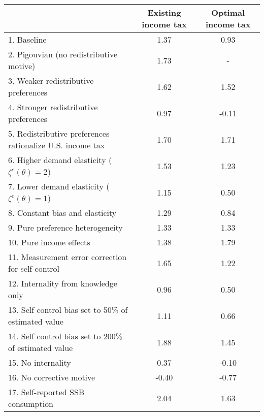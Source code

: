 \begin{tabular}{lcc}
\hline
\hline
 & Existing income tax & Optimal income tax \\
\hline
1. Baseline & 1.37 & 0.93 \\
2. Pigouvian (no redistributive motive) & 1.73 & - \\
3. Weaker redistributive preferences & 1.62 & 1.52 \\
4. Stronger redistributive preferences & 0.97 & -0.11 \\
5. Redistributive preferences rationalize U.S. income tax & 1.70 & 1.71 \\
6. Higher demand elasticity ($\zeta^c(\theta) = 2$) & 1.53 & 1.23 \\
7. Lower demand elasticity ($\zeta^c(\theta) = 1$) & 1.15 & 0.50 \\
8. Constant bias and elasticity & 1.29 & 0.84 \\
9. Pure preference heterogeneity & 1.33 & 1.33 \\
10. Pure income effects & 1.38 & 1.79 \\
11. Measurement error correction for self control & 1.65 & 1.22 \\
12. Internality from knowledge only & 0.96 & 0.50 \\
13. Self control bias set to 50\% of estimated value & 1.11 & 0.66 \\
14. Self control bias set to 200\% of estimated value & 1.88 & 1.45 \\
15. No internality & 0.37 & -0.10 \\
16. No corrective motive & -0.40 & -0.77 \\
17. Self-reported SSB consumption & 2.04 & 1.63 \\
\hline
\hline
\end{tabular}
